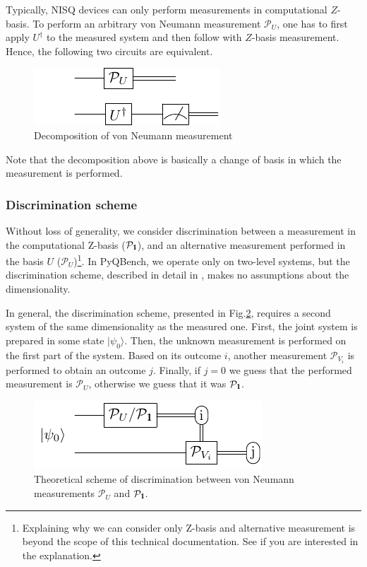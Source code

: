 \documentclass[preprint,12pt, a4paper]{elsarticle}
\newcommand{\ket}[1]{\ensuremath{|#1\rangle}}
\newcommand{\1}{{\rm 1\hspace{-0.9mm}l}}
\newcommand{\Id}{{\rm 1\hspace{-0.9mm}l}}
\newcommand{\PP}{\mathcal{P}}
\begin{document}
Typically, NISQ devices can only perform measurements in computational $Z$-basis.
To perform an arbitrary von Neumann measurement $\PP_{U}$, one has to first apply $U^\dagger$
to the measured system and then follow with $Z$-basis measurement. Hence, the following two
circuits are equivalent.

\begin{figure}[h!]
	\centering
	\includegraphics[scale=1.7]{pics/vonneuman}
	\caption{Decomposition of von Neumann measurement}
	\label{fig:vonnneuman}
\end{figure}

Note that the decomposition above is basically a change of basis in which the measurement
is performed.

\subsubsection{Discrimination scheme}

Without loss of generality, we consider discrimination between a measurement in the computational
Z-basis ($\PP_\Id$), and an alternative measurement performed in the basis $U$
($\PP_U$)\footnote{Explaining why we can consider only Z-basis and alternative measurement is beyond
the scope of this technical documentation. See \cite{puchala2018strategies} if you are interested in
the explanation.}. In PyQBench, we operate only on two-level systems, but the discrimination scheme,
described in detail in \cite{puchala2018strategies}, makes no assumptions about the dimensionality.

In general, the discrimination scheme, presented in Fig.\ref{fig:theoretical_scheme}, requires a
second system of the same dimensionality as the measured one. First, the joint system is prepared in
some state $\ket{\psi_0}$. Then, the unknown measurement is performed on the first part of the
system. Based on its outcome $i$, another measurement $\mathcal{P}_{V_i}$ is performed to obtain an
outcome $j$. Finally, if $j=0$ we guess that the performed measurement is $\mathcal{P}_U$, otherwise
we guess that it was $\mathcal{P}_\Id$.

\begin{figure}[h!]
	\centering
	\includegraphics[scale=1.7]{pics/theoretical_scheme}
	\caption{Theoretical  scheme of discrimination  between von Neumann measurements $\PP_{U}$ and $\PP_\Id$. }
	\label{fig:theoretical_scheme}
\end{figure}
\end{document}
